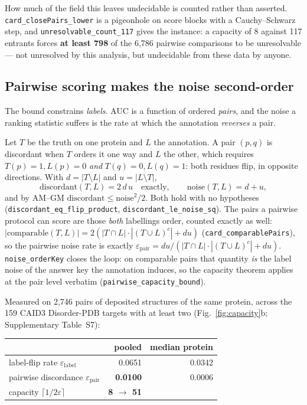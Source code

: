 \documentclass[11pt,a4paper]{article}
\newcommand{\eps}{\varepsilon}
\newcommand{\code}[1]{\texttt{\small #1}}
\begin{document}
How much of the field this leaves undecidable is counted rather than asserted.
\code{card\_closePairs\_lower} is a pigeonhole on score blocks with a
Cauchy--Schwarz step, and \code{unresolvable\_count\_117} gives the instance: a
capacity of 8 against 117 entrants forces \textbf{at least 798} of the 6{,}786
pairwise comparisons to be unresolvable --- not unresolved by this analysis, but
undecidable from these data by anyone.

\subsection*{Pairwise scoring makes the noise second-order}

The bound constrains \emph{labels}. AUC is a function of ordered \emph{pairs},
and the noise a ranking statistic suffers is the rate at which the annotation
\emph{reverses} a pair.

Let $T$ be the truth on one protein and $L$ the annotation. A pair $(p,q)$ is
discordant when $T$ orders it one way and $L$ the other, which requires
$T(p){=}1, L(p){=}0$ \emph{and} $T(q){=}0, L(q){=}1$: both residues flip, in
opposite directions. With $d = |T \setminus L|$ and $u = |L \setminus T|$,
\[
  \mathrm{discordant}(T,L) = 2\,d\,u \quad\text{exactly},
  \qquad \mathrm{noise}(T,L) = d+u ,
\]
and by AM--GM $\mathrm{discordant} \le \mathrm{noise}^2/2$. Both hold with no
hypotheses (\code{discordant\_eq\_flip\_product},
\code{discordant\_le\_noise\_sq}). The pairs a pairwise protocol can score are
those \emph{both} labellings order, counted exactly as well:
$|\mathrm{comparable}(T,L)| = 2(|T \cap L|\cdot|(T \cup L)^{c}| + du)$
(\code{card\_comparablePairs}), so the pairwise noise rate is exactly
$\eps_{\text{pair}} = du/(|T \cap L|\cdot|(T \cup L)^{c}| + du)$.
\code{noise\_orderKey} closes the loop: on comparable pairs that quantity
\emph{is} the label noise of the answer key the annotation induces, so the
capacity theorem applies at the pair level verbatim
(\code{pairwise\_capacity\_bound}).

Measured on 2{,}746 pairs of deposited structures of the same protein, across
the 159 CAID3 Disorder-PDB targets with at least two (Fig.~\ref{fig:capacity}b;
Supplementary Table~S7):

\begin{center}\small
\begin{tabular}{lrr}
\toprule
 & pooled & median protein \\
\midrule
label-flip rate $\eps_{\text{label}}$ & 0.0651 & 0.0342 \\
pairwise discordance $\eps_{\text{pair}}$ & \textbf{0.0100} & 0.0006 \\
capacity $\lceil 1/2\eps \rceil$ & \textbf{8 $\rightarrow$ 51} & \\
\bottomrule
\end{tabular}
\end{center}
\end{document}
